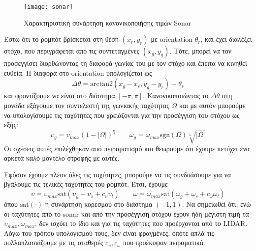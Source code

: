 \begin{figure}
	\centering
	\texttt{[image: sonar]}
	\caption{Χαρακτηριστική συνάρτηση κανονικοποιήσης τιμών Sonar}
	\label{fig:sonar_characteristic}	
\end{figure}

Έστω ότι το ρομπότ βρίσκεται στη θέση $\left( x_r, y_r \right)$ με orientation $\theta_r$, και έχει 
διαλέξει στόχο, που περιγράφεται από τις συντεταγμένες $\left( x_g, y_g \right)$. Τότε, μπορεί να 
τον προσεγγίσει διορθώνοντας τη διαφορά γωνίας του με τον στόχο και έπειτα να κινηθεί ευθεία. Η 
διαφορά στο orientation υπολογίζεται ως
$$
\Delta\theta = \mathrm{arctan2}\left( x_g - x_r, y_g - y_r \right) - \theta_r
$$
και φροντίζουμε να είναι στο διάστημα $[-\pi, \pi]$. Κανονικοποιώντας το $\Delta\theta$ στη μονάδα 
εξάγουμε τον συντελεστή της γωνιακής ταχύτητας $\Omega$ και με αυτόν μπορούμε να υπολογίσουμε τις ταχύτητες που χρειάζονται για την προσέγγιση του στόχου ως εξής:
$$
\upsilon_{g} = \upsilon_{max} \left(1 - \left|\Omega\right|\right)^5 \qquad 
\omega_g = \omega_{max} \mathrm{sgn} \left( \Omega \right) \sqrt[5]{\left|\Omega\right|}
$$
Οι σχέσεις αυτές επιλέχθηκαν από πειραματισμό και θεωρούμε ότι έχουμε πετύχει ένα αρκετά καλό 
μοντέλο στροφής με αυτές.

Εφόσον έχουμε πλέον όλες τις ταχύτητες, μπορούμε να τις συνδυάσουμε για να βγάλουμε τις τελικές 
ταχύτητες του ρομπότ. Έτσι, έχουμε
$$
\upsilon = \upsilon_{max}\mathrm{sat}\left(\upsilon_{g}+\upsilon_{s}+c_\upsilon\upsilon_{l}\right) \qquad
\omega = \omega_{max} \mathrm{sat} \left( \omega_{g} + \omega_{s} + c_\omega\omega_{l} \right)
$$
όπου $\mathrm{sat}(\cdot)$ η συνάρτηση κορεσμού στο διάστημα $(-1, 1)$. Να σημειωθεί ότι, ενώ οι 
ταχύτητες από το sonar και από την προσέγγιση στόχου έχουν ήδη μέγιστη τιμή τα $\upsilon_{max},  
\omega_{max}$, δεν ισχύει το ίδιο και για τις ταχύτητες που προέρχονται από το LIDAR. Λόγω του 
τρόπου υπολογισμού τους, δεν είναι φραγμένες, οπότε απλά τις πολλαπλασιάζουμε με τις σταθερές $c_
\upsilon, c_\omega$ που προέκυψαν πειραματικά.